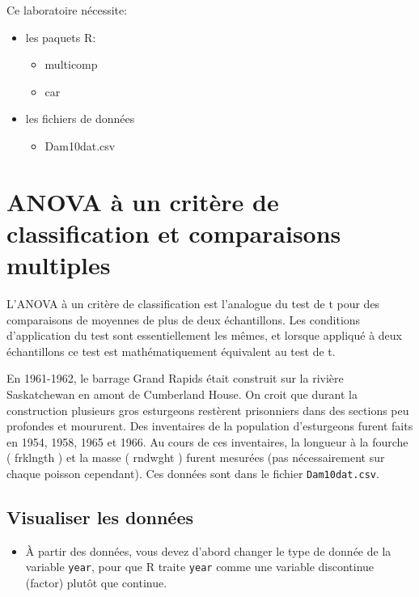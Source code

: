 \documentclass[12pt,]{book}
\providecommand{\tightlist}{%
  \setlength{\itemsep}{0pt}\setlength{\parskip}{0pt}}
\begin{document}
Ce laboratoire nécessite:

\begin{itemize}
\tightlist
\item
  les paquets R:

  \begin{itemize}
  \tightlist
  \item
    multicomp
  \item
    car
  \end{itemize}
\item
  les fichiers de données

  \begin{itemize}
  \tightlist
  \item
    Dam10dat.csv
  \end{itemize}
\end{itemize}

\hypertarget{anova-uxe0-un-crituxe8re-de-classification-et-comparaisons-multiples}{%
\section{ANOVA à un critère de classification et comparaisons multiples}\label{anova-uxe0-un-crituxe8re-de-classification-et-comparaisons-multiples}}

L'ANOVA à un critère de classification est l'analogue du test de t pour des comparaisons de moyennes de plus de deux échantillons. Les conditions d'application du test sont essentiellement les mêmes, et lorsque appliqué à deux échantillons ce test est mathématiquement équivalent au test de t.

En 1961-1962, le barrage Grand Rapids était construit sur la rivière Saskatchewan en amont de Cumberland House. On croit que durant la construction plusieurs gros esturgeons restèrent prisonniers dans des sections peu profondes et moururent. Des inventaires de la population d'esturgeons furent faits en 1954, 1958, 1965 et 1966. Au cours de ces inventaires, la longueur à la fourche ( frklngth ) et la masse ( rndwght ) furent mesurées (pas nécessairement sur chaque poisson cependant). Ces données sont dans le fichier \texttt{Dam10dat.csv}.

\hypertarget{visualiser-les-donnuxe9es}{%
\subsection{Visualiser les données}\label{visualiser-les-donnuxe9es}}

\begin{itemize}
\tightlist
\item
  À partir des données, vous devez d'abord changer le type de donnée de la variable \texttt{year}, pour que R traite \texttt{year} comme une variable discontinue (factor) plutôt que continue.
\end{itemize}
\end{document}

